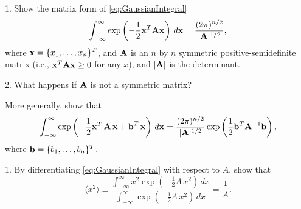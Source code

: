 \documentclass{book}
\begin{document}



1. Show the matrix form of \eqref{eq:GaussianIntegral}
\begin{equation}
  \int_{-\infty}^{\infty}
  \exp\left( -\frac{1}{2} \boldsymbol{\mathbf{x}}^T \boldsymbol{\mathbf{A}} \boldsymbol{\mathbf{x}} \right) \, d\boldsymbol{\mathbf{x}}
  =
  \frac{ (2\pi)^{n/2} }
  { |\boldsymbol{\mathbf{A}}|^{1/2} },
  \label{eq:GaussianIntegralMatrix}
\end{equation}
%
where
$\boldsymbol{\mathbf{x}} = \{x_1, \dots, x_n\}^T$,
and
$\boldsymbol{\mathbf{A}}$ is an $n$ by $n$ symmetric positive-semidefinite matrix
(i.e., $\boldsymbol{\mathbf{x}}^T \boldsymbol{\mathbf{A}} \boldsymbol{\mathbf{x}} \ge 0$ for any $x$),
and
$|\boldsymbol{\mathbf{A}}|$ is the determinant.


2. What happens if $\boldsymbol{\mathbf{A}}$ is not a symmetric matrix?







More generally, show that
\begin{equation}
  \int_{-\infty}^{\infty}
  \exp\left(
    -\frac{1}{2} \boldsymbol{\mathbf{x}}^T \, \boldsymbol{\mathbf{A}} \, \boldsymbol{\mathbf{x}}
    + \boldsymbol{\mathbf{b}}^T \, \boldsymbol{\mathbf{x}}
  \right) \, d\boldsymbol{\mathbf{x}}
  =
  \frac{ (2\pi)^{n/2} }
  { |\boldsymbol{\mathbf{A}}|^{1/2} }
  \exp\left( \frac{1}{2} \boldsymbol{\mathbf{b}}^T \boldsymbol{\mathbf{A}}^{-1} \boldsymbol{\mathbf{b}} \right),
  \label{eq:GaussianIntegralMatrixb}
\end{equation}
%
where $\boldsymbol{\mathbf{b}} = \{b_1, \dots, b_n\}^T$.
%






1. By differentiating \eqref{eq:GaussianIntegral} with respect to $A$, show that
\begin{equation}
  \langle x^2 \rangle
\equiv \frac {
  \int_{-\infty}^{\infty}
    x^2 \exp\left( - \frac{1}{2} A\,x^2 \right) \, dx
} {
  \int_{-\infty}^{\infty}
  \exp\left( - \frac{1}{2} A\,x^2 \right) \, dx
}
=
\frac{1}{A}.
\end{equation}
\end{document}
